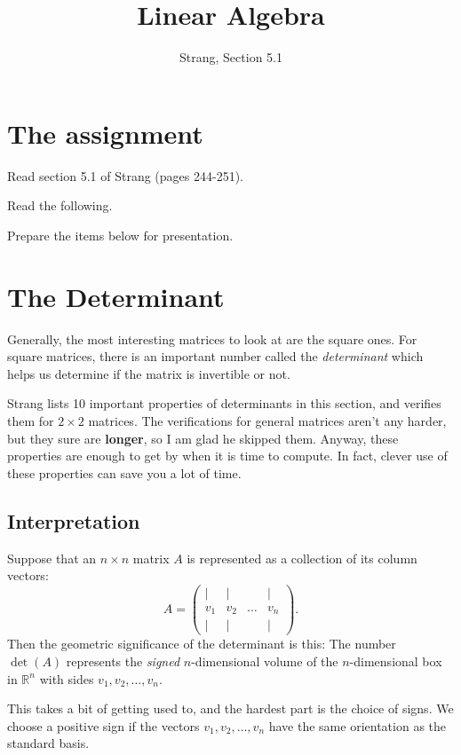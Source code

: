 \documentclass[11pt]{amsart}
\theoremstyle{definition}
\begin{document}
\title{Linear Algebra}
\author{Strang, Section 5.1}
\maketitle

\section{The assignment}
\begin{compactitem}
\item Read section 5.1 of Strang (pages 244-251).
\item Read the following.
\item Prepare the items below for presentation.
\end{compactitem}


\section{The Determinant}

Generally, the most interesting matrices to look at are the square ones. For square matrices, there is an important number called the \emph{determinant} which helps us determine if the matrix is invertible or not.

Strang lists 10 important properties of determinants in this section, and verifies them for $2\times 2$ matrices. The verifications for general matrices aren't any harder, but they sure are \textbf{longer}, so I am glad he skipped them. Anyway, these properties are enough to get by when it is time to compute. In fact, clever use of these properties can save you a lot of time.

\subsection{Interpretation}

Suppose that an $n\times n$ matrix $A$ is represented as a collection of its column vectors:
\[
A = \begin{pmatrix}
| & | &  & | \\
v_1 & v_2 & \dots & v_n \\
| & | &  & |
\end{pmatrix} .
\]
Then the geometric significance of the determinant is this: The number $\det(A)$ represents the \emph{signed} $n$-dimensional volume of the $n$-dimensional box in $\mathbb{R}^n$ with sides $v_1, v_2, \ldots, v_n$.

This takes a bit of getting used to, and the hardest part is the choice of signs. We choose a positive sign if the vectors $v_1, v_2, \ldots, v_n$ have the same orientation as the standard basis.
\end{document}
